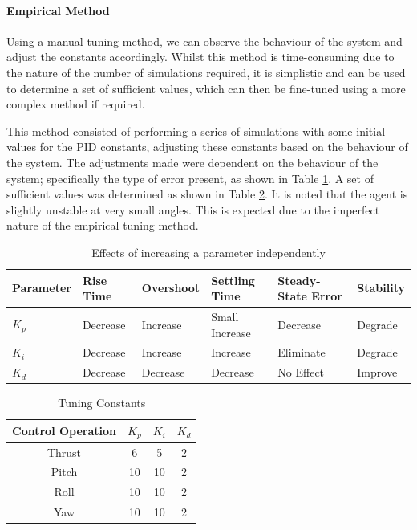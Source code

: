 \documentclass[12pt]{article}
\begin{document}
\paragraph{Empirical Method}
Using a manual tuning method, we can observe the behaviour of the system and adjust the constants accordingly. Whilst this method is time-consuming due to the nature of the number of simulations required, it is simplistic and can be used to determine a set of sufficient values, which can then be fine-tuned using a more complex method if required.

This method consisted of performing a series of simulations with some initial values for the PID constants, adjusting these constants based on the behaviour of the system. The adjustments made were dependent on the behaviour of the system; specifically the type of error present, as shown in Table \ref{tab:parameter_effects}. A set of sufficient values was determined as shown in Table \ref{tab:pid-tuning}. It is noted that the agent is slightly unstable at very small angles. This is expected due to the imperfect nature of the empirical tuning method. 

\begin{table}[ht]
    \centering
    \begin{tabular}{|l|l|l|l|l|l|}
    \hline
    Parameter & Rise Time  & Overshoot & Settling Time & Steady-State Error & Stability \\ \hline
    \( K_p \) & Decrease    & Increase   & Small Increase  & Decrease           & Degrade   \\ \hline
    \( K_i \) & Decrease    & Increase   & Increase      & Eliminate          & Degrade   \\ \hline
    \( K_d \) & Decrease & Decrease   & Decrease      & No Effect& Improve \\ \hline
    \end{tabular}
    \caption{Effects of increasing a parameter independently\cite{ang2005pid}}
    \label{tab:parameter_effects}
\end{table}
    
\begin{table}[ht]
    \centering
        \begin{tabular}{| c | c | c | c |} 
        \hline
        Control Operation & $K_p$ & $K_i$ & $K_d$ \\ 
        \hline
        Thrust & 6 & 5 & 2 \\
        \hline
        Pitch & 10 & 10 & 2 \\
        \hline
        Roll & 10 & 10 & 2 \\
        \hline
        Yaw & 10 & 10 & 2 \\
        \hline
        \end{tabular}
        \caption{Tuning Constants}
        \label{tab:pid-tuning}
\end{table}
\end{document}

